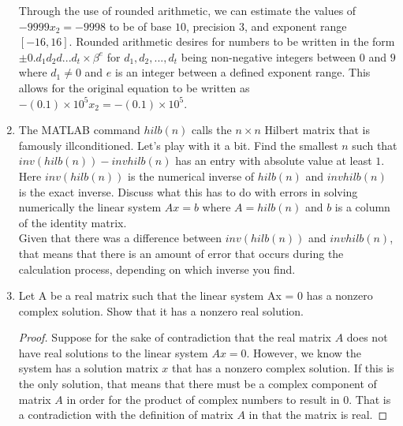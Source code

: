 \documentclass{article}
\begin{document}
\begin{enumerate}
    Through the use of rounded arithmetic, we can estimate the values of $-9999x_2 = -9998$ to be of base $10$, precision $3$, and exponent range $[-16, 16]$. Rounded arithmetic desires for numbers to be written in the form $\pm 0.d_1d_2d...d_t\times \beta^e$ for $d_1, d_2, ..., d_t$ being non-negative integers between $0$ and $9$ where $d_1\neq 0$ and $e$ is an integer between a defined exponent range. This allows for the original equation to be written as $-(0.1)\times 10^5 x_2 = -(0.1)\times 10^5$.\\
    
    \item The MATLAB command $hilb(n)$ calls the $n \times n$ Hilbert matrix that is famously illconditioned.
    Let’s play with it a bit.
    Find the smallest $n$ such that $inv(hilb(n))-invhilb(n)$ has an entry with absolute value at least $1$.
    Here $inv(hilb(n))$ is the numerical inverse of $hilb(n)$ and $invhilb(n)$ is the exact inverse.
    Discuss what this has to do with errors in solving numerically the linear system $Ax = b$ where $A = hilb(n)$ and $b$ is a column of the identity matrix.\\
    
    Given that there was a difference between $inv(hilb(n))$ and $invhilb(n)$, that means that there is an amount of error that occurs during the calculation process, depending on which inverse you find.\\
    
    \item Let A be a real matrix such that the linear system Ax = 0 has a nonzero complex solution. Show that it has a nonzero real solution.\\
    
    \begin{proof}
    Suppose for the sake of contradiction that the real matrix $A$ does not have real solutions to the linear system $Ax=0$. However, we know the system has a solution matrix $x$ that has a nonzero complex solution. If this is the only solution, that means that there must be a complex component of matrix $A$ in order for the product of complex numbers to result in 0. That is a contradiction with the definition of matrix $A$ in that the matrix is real.
    \end{proof}
    
\end{enumerate}
\end{document}
